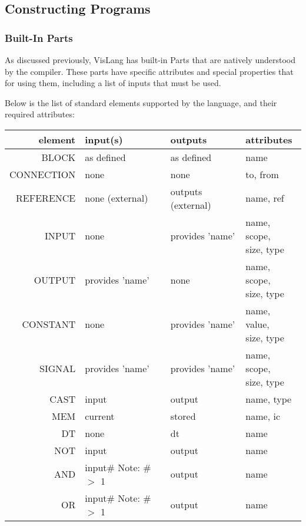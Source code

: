 \subsection{Constructing Programs}
\subsubsection{Built-In Parts}
As discussed previously, VisLang has built-in Parts that are natively understood by the compiler.
These parts have specific attributes and special properties that for using them, including a list of inputs that must be used.
\par
Below is the list of standard elements supported by the language, and their required attributes:
\begin{longtable}[c]{ |r|l|l|l| } 
    \hline
    element & input(s) & outputs & attributes \\ 
    \hline
    \hline
    BLOCK & as defined & as defined & name \\ 
    \hline
    CONNECTION & none & none & to, from \\
    \hline
    REFERENCE & none (external) & outputs (external) & name, ref \\ 
    \hline
    \hline
    INPUT & none & provides 'name' & \specialcell{name, scope, \\ size, type} \\ 
    \hline
    OUTPUT & provides 'name' & none & \specialcell{name, scope, \\ size, type} \\ 
    \hline
    CONSTANT & none & provides 'name' & \specialcell{name, value, \\ size, type} \\ 
    \hline
    SIGNAL & provides 'name' & provides 'name' & \specialcell{name, scope, \\ size, type} \\ 
    \hline
    \hline
    CAST & input & output & name, type \\
    \hline
    MEM & current & stored & name, ic \\
    \hline
    DT & none & dt & name \\
    \hline
    NOT & input & output & name \\
    \hline
    AND & \specialcell{input\# \\ Note: \# $>$ 1} & output & name \\
    \hline
    OR & \specialcell{input\# \\ Note: \# $>$ 1} & output & name \\

\end{longtable}
